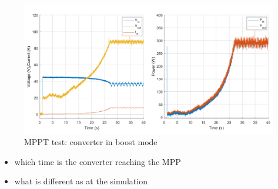 \begin{figure}[H]
	\begin{center}
		\includegraphics[width=1\textwidth]{../Pictures/P1/Test/Boost_mode_MPPT_Vin_Vout_Iin_Pin_Pout}
		\caption{MPPT test: converter in boost mode}
		\label{MPPTtestboostmode}
	\end{center}	
\end{figure}

\begin{itemize}
	\item which time is the converter reaching the MPP 
	
	\item what is different as at the simulation
\end{itemize}






